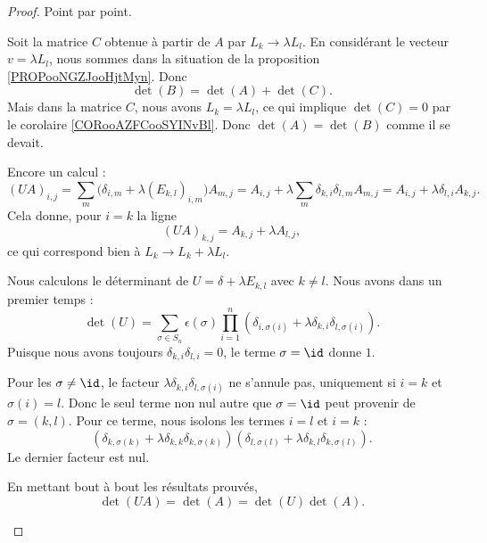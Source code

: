 \begin{proof}
	Point par point.
	\begin{subproof}
		\spitem[\ref{ITEMooJSRDooTggEyO}]
		Soit la matrice \( C\) obtenue à partir de \( A\) par \( L_k\to \lambda L_l\). En considérant le vecteur \( v=\lambda L_l\), nous sommes dans la situation de la proposition \ref{PROPooNGZJooHjtMyn}. Donc
		\begin{equation}
			\det(B)=\det(A)+\det(C).
		\end{equation}
		Mais dans la matrice \( C\), nous avons \( L_k=\lambda L_l\), ce qui implique \( \det(C)=0\) par le corolaire \ref{CORooAZFCooSYINvBl}. Donc \( \det(A)=\det(B)\) comme il se devait.

		\spitem[\ref{ITEMooHKZWooVZDgnf}]
		Encore un calcul :
		\begin{equation}
			(UA)_{i,j}=\sum_m\big( \delta_{i,m}+\lambda(E_{k,l})_{i,m} \big)A_{m,j}=A_{i,j}+\lambda\sum_m\delta_{k,i}\delta_{l,m}A_{m,j}=A_{i,j}+\lambda \delta_{l,i}A_{k,j}.
		\end{equation}
		Cela donne, pour \( i=k\) la ligne
		\begin{equation}
			(UA)_{k,j}=A_{k,j}+\lambda A_{l,j},
		\end{equation}
		ce qui correspond bien à \( L_k\to L_k+\lambda L_l\).

		\spitem[\ref{ITEMooPGYJooWTTghT}]
		Nous calculons le déterminant de \( U=\delta+\lambda E_{k,l}\) avec \( k\neq l\). Nous avons dans un premier temps :
		\begin{equation}
			\det(U)=\sum_{\sigma\in S_n}\epsilon(\sigma)\prod_{i=1}^n(\delta_{i,\sigma(i)}+\lambda \delta_{k,i}\delta_{l,\sigma(i)}).
		\end{equation}
		Puisque nous avons toujours \( \delta_{k,i}\delta_{l,i}=0\), le terme \( \sigma=\id\) donne \( 1\).

		Pour les \( \sigma\neq \id\), le facteur \( \lambda\delta_{k,i}\delta_{l,\sigma(i)}\) ne s'annule pas, uniquement si \( i=k\) et \( \sigma(i)=l\). Donc le seul terme non nul autre que \( \sigma=\id\) peut provenir de \( \sigma=(k,l)\). Pour ce terme, nous isolons les termes \( i=l\) et \( i=k\) :
		\begin{equation}
			(\delta_{k,\sigma(k)}+\lambda\delta_{k,k}\delta_{k,\sigma(k)})(\delta_{l,\sigma(l)}+\lambda\delta_{k,l}\delta_{k,\sigma(l)}).
		\end{equation}
		Le dernier facteur est nul.

		\spitem[\ref{ITEMooBBEAooZJVGNV}]
		En mettant bout à bout les résultats prouvés,
		\begin{equation}
			\det(UA)=\det(A)=\det(U)\det(A).
		\end{equation}
	\end{subproof}
\end{proof}

